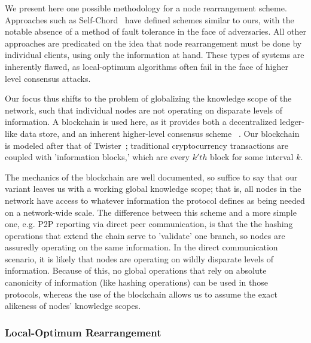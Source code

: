 \documentclass[10pt]{IEEEtran}
\begin{document}
\par We present here one possible methodology for a node rearrangement scheme. Approaches such as Self-Chord~\cite{forestiero2009self} have defined schemes similar to ours, with the notable absence of a method of fault tolerance in the face of adversaries. All other approaches are predicated on the idea that node rearrangement must be done by individual clients, using only the information at hand. These types of systems are inherently flawed, as local-optimum algorithms often fail in the face of higher level consensus attacks.

\par Our focus thus shifts to the problem of globalizing the knowledge scope of the network, such that individual nodes are not operating on disparate levels of information. A blockchain is used here, as it provides both a decentralized ledger-like data store, and an inherent higher-level consensus scheme ~\cite{Nakamoto:2008ti}. Our blockchain is modeled after that of Twister~\cite{Freitas:2013tb}; traditional cryptocurrency transactions are coupled with 'information blocks,' which are every $k'th$ block for some interval $k$.

\par The mechanics of the blockchain are well documented, so suffice to say that our variant leaves us with a working global knowledge scope; that is, all nodes in the network have access to whatever information the protocol defines as being needed on a network-wide scale. The difference between this scheme and a more simple one, e.g. P2P reporting via direct peer communication, is that the the hashing operations that extend the chain serve to 'validate' one branch, so nodes are assuredly operating on the same information. In the direct communication scenario, it is likely that nodes are operating on wildly disparate levels of information. Because of this, no global operations that rely on absolute canonicity of information (like hashing operations) can be used in those protocols, whereas the use of the blockchain allows us to assume the exact alikeness of nodes' knowledge scopes.

\subsubsection{Local-Optimum Rearrangement}
\end{document}
